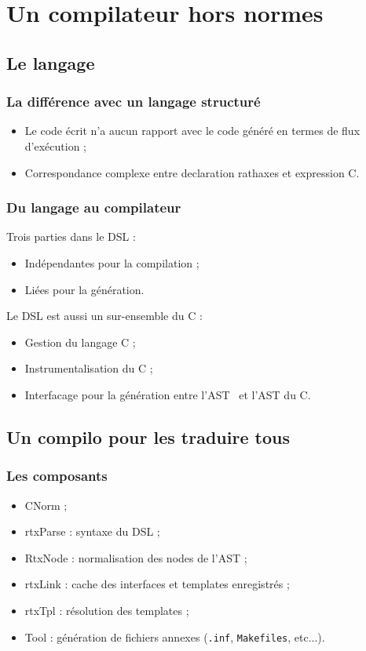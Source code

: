 \documentclass[]{beamer}
\begin{document}
\section{Un compilateur hors normes}

\subsection{Le langage \rtx}
\begin{frame}
\frametitle{La différence avec un langage structuré}
\begin{itemize}[<+->]
    \item Le code écrit n'a aucun rapport avec le code généré en termes
        de flux d'exécution ;
    \item Correspondance complexe entre declaration rathaxes et expression C.
\end{itemize}
\end{frame}

\begin{frame}
\frametitle{Du langage au compilateur}
 {
    Trois parties dans le DSL :
    \begin{itemize}
        \item Indépendantes pour la compilation ;
        \item Liées pour la génération.
    \end{itemize}
}
 {
    Le DSL est aussi un sur-ensemble du C :
    \begin{itemize}
        \item Gestion du langage C ;
        \item Instrumentalisation du C ;
        \item Interfacage pour la génération entre
            l'AST \rtx\ et l'AST du C.
    \end{itemize}
}
\end{frame}


\subsection{Un compilo pour les traduire tous}
\begin{frame}
\frametitle{Les composants}
\begin{itemize}[<+->]
    \item CNorm ;
    \item rtxParse : syntaxe du DSL ;
    \item RtxNode : normalisation des nodes de l'AST ;
    \item rtxLink : cache des interfaces et templates enregistrés ;
    \item rtxTpl : résolution des templates ;
    \item Tool : génération de fichiers annexes (\texttt{.inf},
                 \texttt{Makefiles}, etc...).
\end{itemize}
\end{frame}
\end{document}

